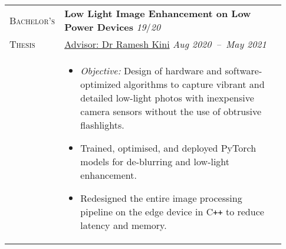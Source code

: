 \documentclass[letterpaper, 10pt, oneside]{article}
\newcommand{\stitle}[1]{\normalsize{\textsc{#1}}}
\newcommand{\bdit}[1]{{\textbf{#1}}}
\begin{document}
\begin{longtable}{@{} p{0.13\linewidth} p{0.8\linewidth}}

    \stitle{Bachelor's}  & \bdit{Low Light Image Enhancement on Low Power Devices} \hfill \textsl{19}/\textsl{20}                                                                                    \\
    \stitle{Thesis}      & \href{https://ece.nitk.ac.in/faculty/ramesh-kini-m}{Advisor: Dr Ramesh Kini} \hfill \textsl{Aug 2020\ --\ May 2021}                                                       \\
                         & \parbox{0.8\textwidth}{                                                                                                                                                   %
        \begin{itemize}[leftmargin=*, itemsep=-0.70ex, topsep=-0.88ex]
            \item \textsl{Objective:} Design of hardware and software-optimized algorithms to capture vibrant and detailed low-light photos with inexpensive camera sensors without the use of obtrusive flashlights.
            \item Trained, optimised, and deployed PyTorch models for de-blurring and low-light enhancement.
            \item Redesigned the entire image processing pipeline on the edge device in C\texttt{++} to reduce latency and memory.
        \end{itemize}
    }
    \\
    \\


\end{longtable}
\end{document}
